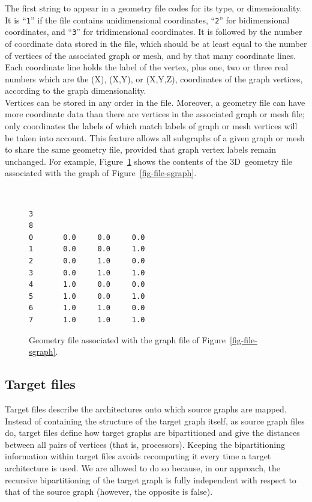 The first string to appear in a geometry file codes for its type, or
dimensionality. It is ``\texttt{1}'' if the file contains unidimensional
coordinates, ``\texttt{2}'' for bidimensional coordinates, and ``\texttt{3}'' for
tridimensional coordinates.
It is followed by the number of coordinate data stored in the file, which
should be at least equal to the number of vertices of the associated graph
or mesh, and by that many coordinate lines.
Each coordinate line holds the label of the vertex, plus one, two or three
real numbers which are the (X), (X,Y), or (X,Y,Z), coordinates of the graph
vertices, according to the graph dimensionality.
\\
Vertices can be stored in any order in the file. Moreover, a geometry
file can have more coordinate data than there are vertices in the
associated graph or mesh file; only coordinates the labels of which
match labels of graph or mesh vertices will be taken into account.
This feature allows all subgraphs of a given graph or mesh to share the
same geometry file, provided that graph vertex labels remain unchanged.
For example, Figure~\ref{fig-file-geom} shows the contents of the 3D~geometry
file associated with the graph of Figure~\ref{fig-file-sgraph}.
\begin{figure}[hbt]
\begin{center}
\begin{minipage}{4.6cm}
{\renewcommand{\baselinestretch}{1.05}
 \footnotesize \tt
\begin{verbatim}
3
8
0       0.0     0.0     0.0
1       0.0     0.0     1.0
2       0.0     1.0     0.0
3       0.0     1.0     1.0
4       1.0     0.0     0.0
5       1.0     0.0     1.0
6       1.0     1.0     0.0
7       1.0     1.0     1.0
\end{verbatim}
}\end{minipage}
\end{center}
\caption{Geometry file associated with the graph file of
         Figure~\protect\ref{fig-file-sgraph}.}
\label{fig-file-geom}
\end{figure}

\subsection{Target files}
\label{sec-file-target}

Target files describe the architectures onto which source graphs are mapped.
Instead of containing the structure of the target graph itself, as source
graph files do, target files define how target graphs are bipartitioned and
give the distances between all pairs of vertices (that is, processors).
Keeping the bipartitioning information within target files avoids
recomputing it every time a target architecture is used.
We are allowed to do so because, in our approach, the recursive
bipartitioning of the target graph is fully independent with respect to that
of the source graph (however, the opposite is false).

